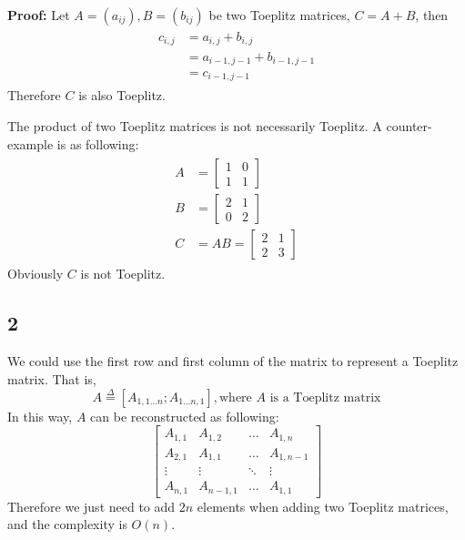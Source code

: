 \documentclass[paper=a4, fontsize=11pt]{scrartcl} %
\numberwithin{equation}{section} %
\numberwithin{figure}{section} %
\numberwithin{table}{section} %
\numberwithin{claimcounter}{section}
\begin{document}
\textbf{Proof:}
Let $A = (a_{ij}), B = (b_{ij})$ be two Toeplitz matrices, $C = A + B$, then
\begin{align}
  \begin{split}
    c_{i,j} &= a_{i,j} + b_{i,j} \\
           &= a_{i-1,j-1} + b_{i-1,j-1} \\
           &= c_{i-1,j-1} 
  \end{split}
\end{align}
Therefore $C$ is also Toeplitz.

The product of two Toeplitz matrices is not necessarily Toeplitz. A
counter-example is as following:
\begin{align}
  \begin{split}
    A &= \begin{bmatrix}
      1 & 0 \\
      1 & 1 
    \end{bmatrix} \\
    B &= \begin{bmatrix}
      2 & 1 \\
      0 & 2 
    \end{bmatrix} \\
    C &= AB = \begin{bmatrix}
      2 & 1 \\
      2 & 3 
    \end{bmatrix}
  \end{split}
\end{align}
Obviously $C$ is not Toeplitz.

\subsection*{2}
We could use the first row and first column of the matrix to represent a
Toeplitz matrix. That is,
\begin{equation}
  A \overset{\Delta}{=} [A_{1, 1...n}; A_{1...n, 1}], \text{where $A$ is a
  Toeplitz matrix}
\end{equation}
In this way, $A$ can be reconstructed as following:
\[
\begin{bmatrix}
  A_{1,1} & A_{1, 2} & \dots & A_{1, n} \\
  A_{2,1} & A_{1, 1} & \dots & A_{1, n-1} \\
  \vdots & \vdots  & \ddots & \vdots \\
  A_{n,1} & A_{n-1, 1} & \dots & A_{1,1}
\end{bmatrix}
\]
Therefore we just need to add $2n$ elements when adding two Toeplitz
matrices, and the complexity is $O(n)$.
\end{document}
